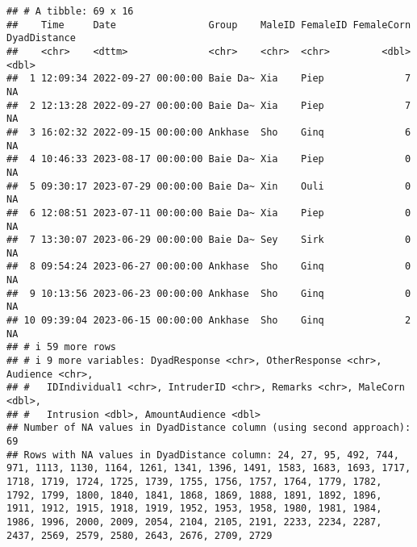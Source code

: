\documentclass[
]{article}
\begin{document}
\begin{verbatim}
## # A tibble: 69 x 16
##    Time     Date                Group    MaleID FemaleID FemaleCorn DyadDistance
##    <chr>    <dttm>              <chr>    <chr>  <chr>         <dbl>        <dbl>
##  1 12:09:34 2022-09-27 00:00:00 Baie Da~ Xia    Piep              7           NA
##  2 12:13:28 2022-09-27 00:00:00 Baie Da~ Xia    Piep              7           NA
##  3 16:02:32 2022-09-15 00:00:00 Ankhase  Sho    Ginq              6           NA
##  4 10:46:33 2023-08-17 00:00:00 Baie Da~ Xia    Piep              0           NA
##  5 09:30:17 2023-07-29 00:00:00 Baie Da~ Xin    Ouli              0           NA
##  6 12:08:51 2023-07-11 00:00:00 Baie Da~ Xia    Piep              0           NA
##  7 13:30:07 2023-06-29 00:00:00 Baie Da~ Sey    Sirk              0           NA
##  8 09:54:24 2023-06-27 00:00:00 Ankhase  Sho    Ginq              0           NA
##  9 10:13:56 2023-06-23 00:00:00 Ankhase  Sho    Ginq              0           NA
## 10 09:39:04 2023-06-15 00:00:00 Ankhase  Sho    Ginq              2           NA
## # i 59 more rows
## # i 9 more variables: DyadResponse <chr>, OtherResponse <chr>, Audience <chr>,
## #   IDIndividual1 <chr>, IntruderID <chr>, Remarks <chr>, MaleCorn <dbl>,
## #   Intrusion <dbl>, AmountAudience <dbl>
## Number of NA values in DyadDistance column (using second approach): 69 
## Rows with NA values in DyadDistance column: 24, 27, 95, 492, 744, 971, 1113, 1130, 1164, 1261, 1341, 1396, 1491, 1583, 1683, 1693, 1717, 1718, 1719, 1724, 1725, 1739, 1755, 1756, 1757, 1764, 1779, 1782, 1792, 1799, 1800, 1840, 1841, 1868, 1869, 1888, 1891, 1892, 1896, 1911, 1912, 1915, 1918, 1919, 1952, 1953, 1958, 1980, 1981, 1984, 1986, 1996, 2000, 2009, 2054, 2104, 2105, 2191, 2233, 2234, 2287, 2437, 2569, 2579, 2580, 2643, 2676, 2709, 2729
\end{verbatim}
\end{document}
